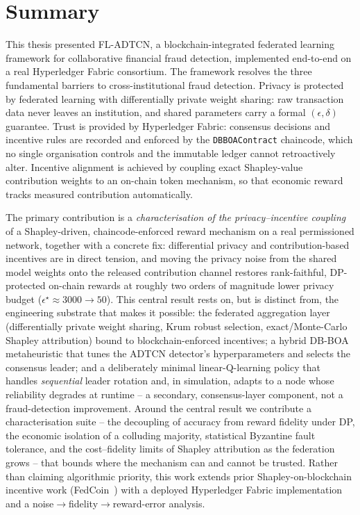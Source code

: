 \section{Summary}

This thesis presented FL-ADTCN, a blockchain-integrated federated learning framework for collaborative financial fraud detection, implemented end-to-end on a real Hyperledger Fabric consortium. The framework resolves the three fundamental barriers to cross-institutional fraud detection. Privacy is protected by federated learning with differentially private weight sharing: raw transaction data never leaves an institution, and shared parameters carry a formal $(\epsilon,\delta)$ guarantee. Trust is provided by Hyperledger Fabric: consensus decisions and incentive rules are recorded and enforced by the \texttt{DBBOAContract} chaincode, which no single organisation controls and the immutable ledger cannot retroactively alter. Incentive alignment is achieved by coupling exact Shapley-value contribution weights to an on-chain token mechanism, so that economic reward tracks measured contribution automatically.

The primary contribution is a \emph{characterisation of the privacy--incentive coupling} of a Shapley-driven, chaincode-enforced reward mechanism on a real permissioned network, together with a concrete fix: differential privacy and contribution-based incentives are in direct tension, and moving the privacy noise from the shared model weights onto the released contribution channel restores rank-faithful, DP-protected on-chain rewards at roughly two orders of magnitude lower privacy budget ($\epsilon^\star\approx 3000\to 50$). This central result rests on, but is distinct from, the engineering substrate that makes it possible: the federated aggregation layer (differentially private weight sharing, Krum robust selection, exact/Monte-Carlo Shapley attribution) bound to blockchain-enforced incentives; a hybrid DB-BOA metaheuristic that tunes the ADTCN detector's hyperparameters and selects the consensus leader; and a deliberately minimal linear-Q-learning policy that handles \emph{sequential} leader rotation and, in simulation, adapts to a node whose reliability degrades at runtime -- a secondary, consensus-layer component, not a fraud-detection improvement. Around the central result we contribute a characterisation suite -- the decoupling of accuracy from reward fidelity under DP, the economic isolation of a colluding majority, statistical Byzantine fault tolerance, and the cost--fidelity limits of Shapley attribution as the federation grows -- that bounds where the mechanism can and cannot be trusted. Rather than claiming algorithmic priority, this work extends prior Shapley-on-blockchain incentive work (FedCoin~\cite{fedcoin2020}) with a deployed Hyperledger Fabric implementation and a noise$\to$fidelity$\to$reward-error analysis.

